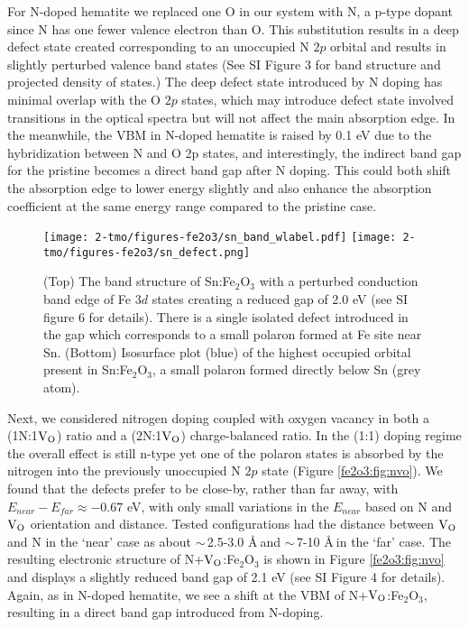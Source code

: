 For N-doped hematite we replaced one O in our system with N, a p-type dopant since N has one fewer valence electron than O. This substitution results in a deep defect state created corresponding to an unoccupied N $2p$ orbital and results in slightly perturbed valence band states (See SI Figure 3 for band structure and projected density of states.) The deep defect state introduced by N doping has minimal overlap with the O $2p$ states, which may introduce defect state involved transitions in the optical spectra but will not affect the main absorption edge. In the meanwhile, the VBM in N-doped hematite is raised by 0.1 eV due to the hybridization between N and O 2p states, and interestingly, the indirect band gap for the pristine  becomes a direct band gap after N doping. This could both shift the absorption edge to lower energy slightly and also enhance the absorption coefficient at the same energy range compared to the pristine case.


\begin{figure}
\begin{center}
\texttt{[image: 2-tmo/figures-fe2o3/sn\_band\_wlabel.pdf]} %
\texttt{[image: 2-tmo/figures-fe2o3/sn\_defect.png]}
\caption{(Top) The band structure of Sn:Fe$_2$O$_3$ with a perturbed conduction band edge of Fe $3d$ states creating a reduced gap of 2.0 eV (see SI figure 6 for details). There is a single isolated defect introduced in the gap which corresponds to a small polaron formed at Fe site near Sn. (Bottom) Isosurface plot (blue) of the highest occupied orbital present in Sn:Fe$_2$O$_3$, a small polaron formed directly below Sn (grey atom).} \label{fe2o3:fig:sn}
\end{center}
\end{figure}


Next, we considered nitrogen doping coupled with oxygen vacancy in both a (1N:1$\text{V}_\text{O}$) ratio and a (2N:1$\text{V}_\text{O}$) charge-balanced ratio. In the (1:1) doping regime the overall effect is still n-type yet one of the polaron states is absorbed by the nitrogen into the previously unoccupied N $2p$ state (Figure \ref{fe2o3:fig:nvo}). We found that the defects prefer to be close-by, rather than far away, with $E_{near}-E_{far}\approx -0.67$ eV, with only small variations in the $E_{near}$ based on N and $\text{V}_\text{O}$ orientation and distance. Tested configurations had the distance between $\text{V}_\text{O}$ and N in the `near' case as about $\sim\,$2.5-3.0 \AA $\ $and $\sim\,$7-10 \AA $\ $in the `far' case. The resulting electronic structure of N+$\text{V}_\text{O}$:Fe$_2$O$_3$ is shown in Figure \ref{fe2o3:fig:nvo} and displays a slightly reduced band gap of 2.1 eV (see SI Figure 4 for details). Again, as in N-doped hematite, we see a shift at the VBM of N+$\text{V}_\text{O}$:Fe$_2$O$_3$, resulting in a direct band gap introduced from N-doping.

